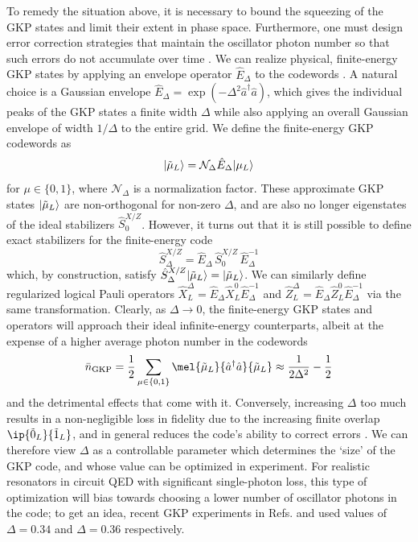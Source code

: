 To remedy the situation above, it is necessary to bound the squeezing of the GKP states and limit their extent in phase space. Furthermore, one must design error correction strategies that maintain the oscillator photon number so that such errors do not accumulate over time \cite{campagne2020gkp-expt}. We can realize physical, finite-energy GKP states by applying an envelope operator $\hat{E}_\Delta$ to the codewords \cite{royer2020gkp}. A natural choice is a Gaussian envelope $\hat{E}_\Delta = \exp(-\Delta^2 \hat{a}^\dagger\hat{a})$, which gives the individual peaks of the GKP states a finite width $\Delta$ while also applying an overall Gaussian envelope of width $1/\Delta$ to the entire grid. We define the finite-energy GKP codewords as 
\begin{equation}
    \lvert\tilde{\mu}_L\rangle = \mathcal{N}_\Delta \hat{E}_\Delta \lvert\mu_L\rangle
\end{equation}
for $\mu \in \{0, 1\}$, where $\mathcal{N}_\Delta$ is a normalization factor. These approximate GKP states $\lvert\tilde{\mu}_L\rangle$ are non-orthogonal for non-zero $\Delta$, and are also no longer eigenstates of the ideal stabilizers $\hat{S}_0^{X/Z}$. However, it turns out that it is still possible to define exact stabilizers for the finite-energy code
\begin{equation}
    \hat{S}_\Delta^{X/Z} = \hat{E}_\Delta\,\hat{S}_0^{X/Z}\,\hat{E}_\Delta^{-1}
\end{equation}
which, by construction, satisfy $\hat{S}_\Delta^{X/Z}\lvert\tilde{\mu}_L\rangle = \lvert\tilde{\mu}_L\rangle$. We can similarly define regularized logical Pauli operators $\hat{X}_L^\Delta = \hat{E}_\Delta \hat{X}_L^0 \hat{E}_\Delta^{-1}$ and $\hat{Z}_L^\Delta = \hat{E}_\Delta \hat{Z}_L^0 \hat{E}_\Delta^{-1}$ via the same transformation. Clearly, as $\Delta \to 0$, the finite-energy GKP states and operators will approach their ideal infinite-energy counterparts, albeit at the expense of a higher average photon number in the codewords 
\begin{equation}
    \bar{n}_{\rm GKP} = \frac{1}{2} \sum_{\mu\in \{0,1\}} \mel{\tilde{\mu}_L}{\hat{a}^\dagger\hat{a}}{\tilde{\mu}_L} \approx \frac{1}{2\Delta^2} - \frac{1}{2}
\end{equation}
and the detrimental effects that come with it. Conversely, increasing $\Delta$ too much results in a non-negligible loss in fidelity due to the increasing finite overlap $\ip{\tilde{0}_L}{\tilde{1}_L}$, and in general reduces the code's ability to correct errors \cite{royer2020gkp}. We can therefore view $\Delta$ as a controllable parameter which determines the `size' of the GKP code, and whose value can be optimized in experiment. For realistic resonators in circuit QED with significant single-photon loss, this type of optimization will bias towards choosing a lower number of oscillator photons in the code; to get an idea, recent GKP experiments in Refs. \cite{sivak2023gkp-expt} and \cite{nordquantique2023gkp-expt} used values of $\Delta = 0.34$ and $\Delta = 0.36$ respectively. 


